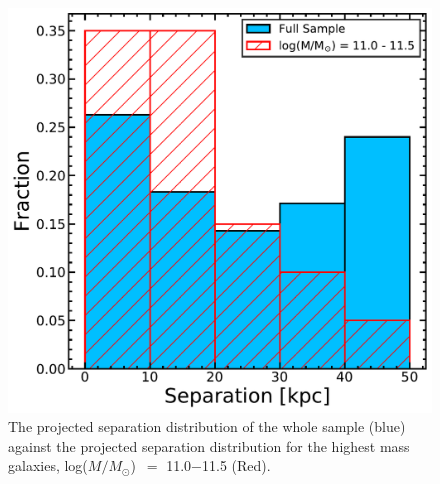 \documentclass[iop,revtex4,twocolumn,apj,numberedappendix,appendixfloats]{emulateapj}
\newcommand{\logm}{log($M/M_{\odot}$)}
\begin{document}
\begin{figure}
\centering
\includegraphics[width=0.8\linewidth]{fig/sep_hist.pdf}
\caption[]{The projected separation distribution of the whole sample (blue) against the projected separation distribution for the highest mass galaxies, \logm\ $=$ 11.0$-$11.5 (Red). }
\label{fig:sep_hist}
\end{figure}
\end{document}
